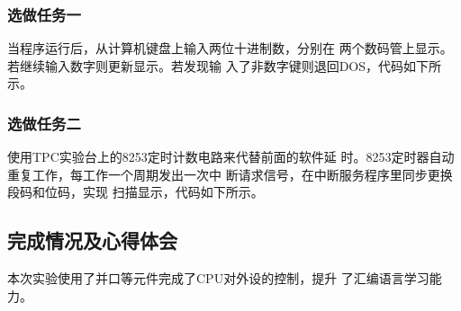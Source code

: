 \documentclass[UTF8,a4paper]{paper}
\begin{document}
\subsubsection{选做任务一}
当程序运行后，从计算机键盘上输入两位十进制数，分别在
两个数码管上显示。若继续输入数字则更新显示。若发现输
入了非数字键则退回DOS，代码如下所示。\\ 

\subsubsection{选做任务二}
使用TPC实验台上的8253定时计数电路来代替前面的软件延
时。8253定时器自动重复工作，每工作一个周期发出一次中
断请求信号，在中断服务程序里同步更换段码和位码，实现
扫描显示，代码如下所示。\\ 

\subsection{完成情况及心得体会}
本次实验使用了并口等元件完成了CPU对外设的控制，提升
了汇编语言学习能力。
\end{document}
